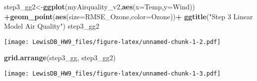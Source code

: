 \documentclass[]{article}
\newenvironment{Shaded}{\begin{snugshade}}{\end{snugshade}}
\newcommand{\KeywordTok}[1]{\textcolor[rgb]{0.13,0.29,0.53}{\textbf{#1}}}
\newcommand{\DataTypeTok}[1]{\textcolor[rgb]{0.13,0.29,0.53}{#1}}
\newcommand{\StringTok}[1]{\textcolor[rgb]{0.31,0.60,0.02}{#1}}
\newcommand{\OperatorTok}[1]{\textcolor[rgb]{0.81,0.36,0.00}{\textbf{#1}}}
\newcommand{\NormalTok}[1]{#1}
\begin{document}
\begin{Shaded}
\begin{Highlighting}[]
\NormalTok{step3_gg2<-}\KeywordTok{ggplot}\NormalTok{(myAirquality_v2,}\KeywordTok{aes}\NormalTok{(}\DataTypeTok{x=}\NormalTok{Temp,}\DataTypeTok{y=}\NormalTok{Wind)) }\OperatorTok{+}\KeywordTok{geom_point}\NormalTok{(}\KeywordTok{aes}\NormalTok{(}\DataTypeTok{size=}\NormalTok{RMSE_Ozone,}\DataTypeTok{color=}\NormalTok{Ozone))}\OperatorTok{+}\StringTok{ }\KeywordTok{ggtitle}\NormalTok{(}\StringTok{"Step 3 Linear Model Air Quality"}\NormalTok{)}
\NormalTok{step3_gg2}
\end{Highlighting}
\end{Shaded}

\texttt{[image: LewisDB\_HW9\_files/figure-latex/unnamed-chunk-1-2.pdf]}

\begin{Shaded}
\begin{Highlighting}[]
\KeywordTok{grid.arrange}\NormalTok{(step3_gg, step3_gg2)}
\end{Highlighting}
\end{Shaded}

\texttt{[image: LewisDB\_HW9\_files/figure-latex/unnamed-chunk-1-3.pdf]}
\end{document}
